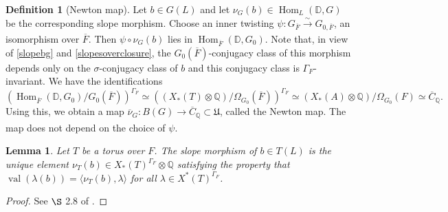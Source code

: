 \documentclass[11pt,a4paper]{article}
\theoremstyle{definition}
\newtheorem{D}[shared]{Definition}
\theoremstyle{plain}
\newtheorem{Le}[shared]{Lemma}
\theoremstyle{remark}
\theoremstyle{plain}
\DeclareMathOperator{\Hom}{Hom}
\DeclareMathOperator{\val}{val}
\begin{document}
\begin{D}[Newton map]\label{newtonmap}
    Let $b \in G(L)$ and let $\nu_G(b) \in \Hom_L(\mathbb{D}, G)$ be the corresponding slope morphism. Choose an inner twisting $\psi: G_{\overline{F}} \xrightarrow[]{\sim} G_{0,\overline{F}}$, an isomorphism over $\overline{F}$. Then $\psi \circ \nu_G(b)$ lies in $\Hom_{\overline{F}}(\mathbb{D}, G_0)$. Note that, in view of \ref{slopebg} and \ref{slopesoverclosure}, the $G_0(\overline{F})$-conjugacy class of this morphism depends only on the $\sigma$-conjugacy class of $b$ and this conjugacy class is $\Gamma_F$-invariant. We have the identifications $$(\Hom_{\overline{F}}(\mathbb{D}, G_0)/G_0(\overline{F}))^{\Gamma_F} \simeq ((X_*(T) \otimes \mathbb{Q}) / \Omega_{G_0}(\overline{F}))^{\Gamma_F} \simeq (X_*(A) \otimes \mathbb{Q})/{\Omega_{G_0}(F)} \simeq \overline{C}_{\mathbb{Q}}.$$
    Using this, we obtain a map $\overline{\nu}_G: B(G) \xrightarrow[]{}\overline{C}_{\mathbb{Q}} \subset \mathfrak{U}$, called the Newton map. The map does not depend on the choice of $\psi$.
\end{D}

\begin{Le}\label{slopetori}
    Let $T$ be a torus over $F$. The slope morphism of $b \in T(L)$ is the unique element $\nu_T(b) \in X_*(T)^{\Gamma_F} \otimes \mathbb{Q}$ satisfying the property that $\val(\lambda(b)) = \langle \nu_T(b), \lambda \rangle$ for all $\lambda \in X^*(T)^{\Gamma_F}$.
\end{Le}
\begin{proof}
    See $\S$ 2.8 of \cite{MR809866}.
\end{proof}
\end{document}
